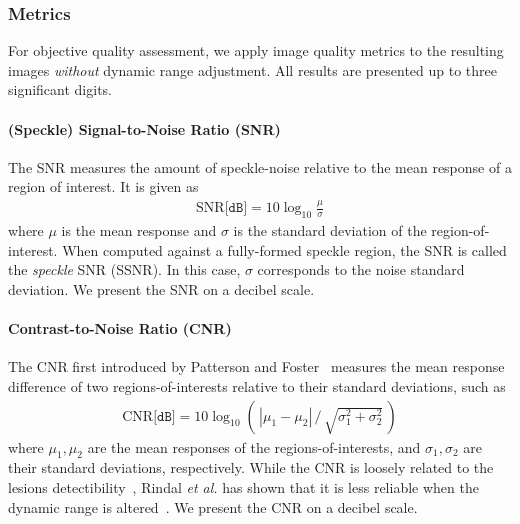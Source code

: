 
%
\subsubsection{Metrics}
For objective quality assessment, we apply image quality metrics to the resulting images \textit{without} dynamic range adjustment.
All results are presented up to three significant digits.

\paragraph{(Speckle) Signal-to-Noise Ratio (SNR)}
The SNR measures the amount of speckle-noise relative to the mean response of a region of interest.
It is given as
\begin{align}
  \mathrm{SNR} \texttt{[dB]} = 10 \log_{10} \frac{\mu}{\sigma}
\end{align}
{\noindent}where \(\mu\) is the mean response and \(\sigma\) is the standard deviation of the region-of-interest.
When computed against a fully-formed speckle region, the SNR is called the \textit{speckle} SNR (SSNR).
In this case, \(\sigma\) corresponds to the noise standard deviation.
We present the SNR on a decibel scale.

\paragraph{Contrast-to-Noise Ratio (CNR)}
The CNR first introduced by Patterson and Foster~\cite{patterson_improvement_1983} measures the mean response difference of two regions-of-interests relative to their standard deviations, such as
\begin{align}
  \mathrm{CNR} \texttt{[dB]} = 10 \log_{10} \left(\,| \mu_{1} - \mu_{2} | \,/\, \sqrt{\sigma^2_1 + \sigma^2_2}\, \right)
\end{align}
{\noindent}where \(\mu_1, \mu_2\) are the mean responses of the regions-of-interests, and \(\sigma_1, \sigma_2\) are their standard deviations, respectively.
While the CNR is loosely related to the lesions detectibility~\cite{smith_ultrasound_1984}, Rindal \textit{et al.} has shown that it is less reliable when the dynamic range is altered~\cite{rindal_effect_2019}.
We present the CNR on a decibel scale.



